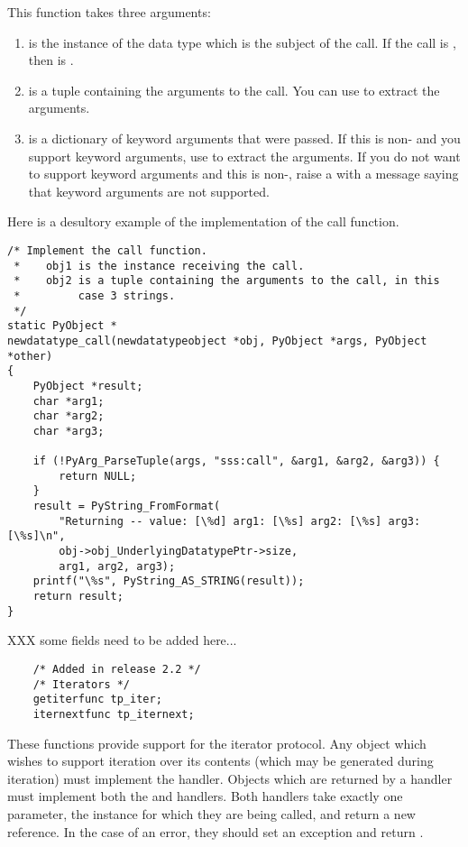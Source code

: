 This function takes three arguments:

\begin{enumerate}
  \item
     is the instance of the data type which is the subject of
    the call. If the call is , then  is
    .

  \item
     is a tuple containing the arguments to the call.  You
    can use  to extract the arguments.

  \item
     is a dictionary of keyword arguments that were passed.
    If this is non-\NULL{} and you support keyword arguments, use
     to extract the
    arguments.  If you do not want to support keyword arguments and
    this is non-\NULL, raise a  with a message
    saying that keyword arguments are not supported.
\end{enumerate}

Here is a desultory example of the implementation of the call function.

\begin{verbatim}
/* Implement the call function.
 *    obj1 is the instance receiving the call.
 *    obj2 is a tuple containing the arguments to the call, in this
 *         case 3 strings.
 */
static PyObject *
newdatatype_call(newdatatypeobject *obj, PyObject *args, PyObject *other)
{
    PyObject *result;
    char *arg1;
    char *arg2;
    char *arg3;

    if (!PyArg_ParseTuple(args, "sss:call", &arg1, &arg2, &arg3)) {
        return NULL;
    }
    result = PyString_FromFormat(
        "Returning -- value: [\%d] arg1: [\%s] arg2: [\%s] arg3: [\%s]\n",
        obj->obj_UnderlyingDatatypePtr->size,
        arg1, arg2, arg3);
    printf("\%s", PyString_AS_STRING(result));
    return result;
}
\end{verbatim}

XXX some fields need to be added here...


\begin{verbatim}
    /* Added in release 2.2 */
    /* Iterators */
    getiterfunc tp_iter;
    iternextfunc tp_iternext;
\end{verbatim}

These functions provide support for the iterator protocol.  Any object
which wishes to support iteration over its contents (which may be
generated during iteration) must implement the 
handler.  Objects which are returned by a  handler must
implement both the  and  handlers.
Both handlers take exactly one parameter, the instance for which they
are being called, and return a new reference.  In the case of an
error, they should set an exception and return \NULL.

